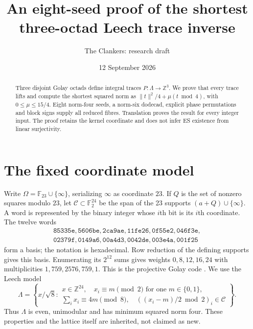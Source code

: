 \documentclass[10pt,reqno]{amsart}
\title{An eight-seed proof of the shortest\\
three-octad Leech trace inverse}
\author{The Clankers: research draft}
\date{12 September 2026}
\theoremstyle{remark}\newtheorem{remark}[theorem]{Remark}
\newcommand{\Z}{\mathbb Z}\newcommand{\Q}{\mathbb Q}\newcommand{\R}{\mathbb R}\newcommand{\F}{\mathbb F}
\newcommand{\La}{\Lambda}\newcommand{\tr}{\operatorname{tr}}
\begin{document}
\begin{abstract}
Three disjoint Golay octads define integral traces $P:\Lambda\to\mathbb Z^3$. We prove that every trace lifts and compute the shortest squared norm as $\|t\|^2/4+\mu(t\bmod4)$, with $0\le\mu\le15/4$. Eight norm-four seeds, a norm-six dodecad, explicit phase permutations and block signs supply all reduced fibres. Translation proves the result for every integer input. The proof retains the kernel coordinate and does not infer ES existence from linear surjectivity.
\end{abstract}
\maketitle
\section{The fixed coordinate model}
Write $\Omega=\F_{23}\cup\{\infty\}$, serializing $\infty$ as coordinate $23$. If $Q$ is the set of nonzero squares modulo $23$, let $\mathcal C\subset\F_2^{24}$ be the span of the 23 supports $(a+Q)\cup\{\infty\}$. A word is represented by the binary integer whose $i$th bit is its $i$th coordinate. The twelve words
\[
\begin{gathered}
\mathtt{85335e,
5606be,
2ca9ae,
11fe26,
0f55e2,
046f3e,}\\
\mathtt{02379f,
0149a6,
00a4d3,
0042de,
003e4a,
001f25}
\end{gathered}
\]
form a basis; the notation is hexadecimal. Row reduction of the defining supports gives this basis. Enumerating its $2^{12}$ sums gives weights $0,8,12,16,24$ with multiplicities $1,759,2576,759,1$. This is the projective Golay code \cite{chapman}. We use the Leech model \cite[Theorem 1.4]{brouwer}
\begin{equation}\label{eq:model}
\La=\left\{x/\sqrt8:\begin{array}{l}x\in\Z^{24},\quad x_i\equiv m\pmod2\text{ for one }m\in\{0,1\},\\
\sum_i x_i\equiv4m\pmod8,\quad ((x_i-m)/2\bmod2)_i\in\mathcal C\end{array}\right\}.
\end{equation}
Thus $\La$ is even, unimodular and has minimum squared norm four. These properties and the lattice itself are inherited, not claimed as new.
\end{document}
